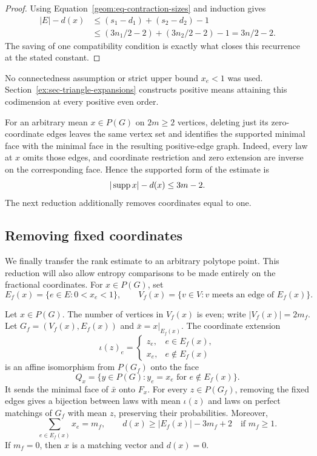 \begin{proof}
Using Equation~\eqref{geom:eq-contraction-sizes} and induction gives
\begin{align*}
 |E|-d(x)
 &\le (s_1-d_1)+(s_2-d_2)-1\\
 &\le (3n_1/2-2)+(3n_2/2-2)-1
   =3n/2-2.
\end{align*}
The saving of one compatibility condition is exactly what closes
this recurrence at the stated constant.
\end{proof}

No connectedness assumption or strict upper bound $x_e<1$ was used.
Section~\ref{ex:sec-triangle-expansions} constructs positive means
attaining this codimension at every positive even order.

For an arbitrary mean $x\in P(G)$ on $2m\ge2$ vertices, deleting just
its zero-coordinate edges leaves the same vertex set and identifies the supported minimal face
with the minimal face in the resulting positive-edge graph. Indeed,
every law at $x$ omits those edges, and coordinate restriction and zero
extension are inverse on the corresponding face. Hence the supported
form of the estimate is
\begin{equation}\label{geom:eq-supported-rank}
                |\operatorname{supp} x|-d(x)\le3m-2.
\end{equation}
The next reduction additionally removes coordinates equal to one.

\subsection{Removing fixed coordinates}

We finally transfer the rank estimate to an arbitrary polytope
point. This reduction will also allow entropy comparisons to be
made entirely on the fractional coordinates.
For \(x\in P(G)\), set
\[
 E_f(x)=\{e\in E:0<x_e<1\},\qquad
 V_f(x)=\{v\in V:v\text{ meets an edge of }E_f(x)\}.
\]

\begin{lemma}
\label{geom:lem-reduction}
Let \(x\in P(G)\). The number of vertices in \(V_f(x)\) is even;
write \(|V_f(x)|=2m_f\). Let
\(G_f=(V_f(x),E_f(x))\) and \(\bar x=x|_{E_f(x)}\).
The coordinate extension
\begin{equation}
\label{geom:eq-extension}
 \iota(z)_e=
 \begin{cases}
 z_e,&e\in E_f(x),\\
 x_e,&e\notin E_f(x)
 \end{cases}
\end{equation}
is an affine isomorphism from \(P(G_f)\) onto the face
\[
 Q_x=\{y\in P(G):y_e=x_e\text{ for }e\notin E_f(x)\}.
\]
It sends the minimal face of \(\bar x\) onto \(F_x\). For every
\(z\in P(G_f)\), removing the fixed edges gives a bijection between
laws with mean \(\iota(z)\) and laws on perfect matchings of \(G_f\)
with mean \(z\), preserving their probabilities. Moreover,
\begin{equation}
\label{geom:eq-fractional-rank}
 \sum_{e\in E_f(x)}x_e=m_f,\qquad
 d(x)\ge |E_f(x)|-3m_f+2\quad\text{if }m_f\ge1.
\end{equation}
If \(m_f=0\), then \(x\) is a matching vector and \(d(x)=0\).
\end{lemma}

